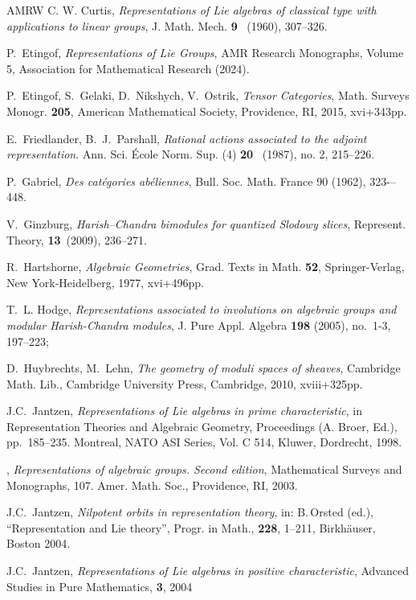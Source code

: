 \documentclass[twoside,12pt,reqno]{amsart}
\theoremstyle{remark}
\numberwithin{equation}{section}
\begin{document}
\begin{thebibliography}{AMRW}
C. W. Curtis,
{\it Representations of Lie algebras of classical type with applications to linear
groups},
J. Math. Mech. {\bf 9} \ (1960), 307--326.

P.~Etingof, {\em Representations of Lie Groups},
AMR Research Monographs, Volume 5, Association for Mathematical Research (2024).

 P.~Etingof, S.~Gelaki, D.~Nikshych, V.~Ostrik, {\em Tensor Categories}, Math. Surveys Monogr. {\bf 205}, American Mathematical Society, Providence, RI, 2015, xvi+343pp.

{E.~Friedlander, B.~J.~Parshall},
{\it Rational actions associated to the adjoint representation}.
Ann. Sci. École Norm. Sup.  (4) {\bf 20} \ (1987), no. 2, 215--226.

 P.~Gabriel, {\em Des catégories abéliennes}, 
Bull. Soc. Math. France 90 (1962), 323-–448.

{V.~Ginzburg},
{\it Harish--Chandra bimodules for quantized Slodowy slices}, {Represent. Theory},
{\bf 13}\ (2009), 236--271.


 R.~Hartshorne, {\em Algebraic Geometries}, Grad. Texts in Math. {\bf 52}, Springer-Verlag, New York-Heidelberg, 1977, xvi+496pp.

 T.~L. Hodge, {\em Representations associated to involutions on algebraic groups and modular Harish-Chandra modules}, J. Pure Appl. Algebra {\bf 198} (2005), no.~1-3, 197--223;

 D.~Huybrechts, M.~Lehn, {\em The geometry of moduli spaces of sheaves}, Cambridge Math. Lib., Cambridge University Press, Cambridge, 2010, xviii+325pp. 

 J.C.~Jantzen, {\em  Representations of Lie algebras in prime characteristic}, in Representation Theories and Algebraic Geometry, Proceedings (A. Broer, Ed.), pp.\ 185--235. Montreal, NATO ASI Series, Vol. C 514, Kluwer, Dordrecht, 1998.

 \bysame, {\em Representations of algebraic groups. Second edition}, Mathematical Surveys and Monographs, 107. Amer. Math. Soc., Providence, RI, 2003.
 
 J.C.~Jantzen, {\em Nilpotent orbits in representation theory}, in: B.\,Orsted (ed.), ``Representation and Lie theory'', Progr. in Math., {\bf 228}, 1--211, Birkh\"auser, Boston 2004.

 J.C.~Jantzen, {\em Representations of Lie algebras in positive characteristic}, Advanced Studies in Pure Mathematics, {\bf 3}, 2004


\end{thebibliography}
\end{document}
